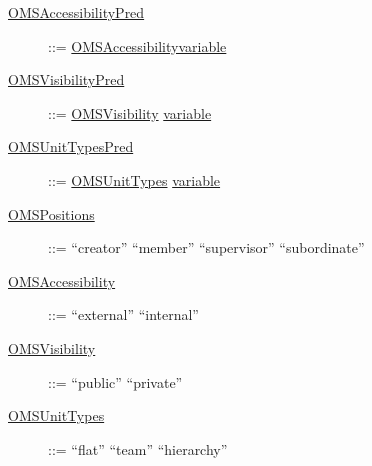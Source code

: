 \begin{description}
\item[\underline{OMSAccessibilityPred}] ::= \underline{OMSAccessibility}\textbar \underline{variable}

\item[\underline{OMSVisibilityPred}] ::= \underline{OMSVisibility} \textbar  \underline{variable}

\item[\underline{OMSUnitTypesPred}] ::= \underline{OMSUnitTypes} \textbar  \underline{variable}


\item[\underline{OMSPositions}] ::= ``creator'' \textbar ``member'' \textbar ``supervisor'' \textbar ``subordinate'' 

\item[\underline{OMSAccessibility}] ::= ``external'' \textbar ``internal''

\item[\underline{OMSVisibility}] ::= ``public'' \textbar ``private''

\item[\underline{OMSUnitTypes}] ::= ``flat'' \textbar ``team'' \textbar ``hierarchy''

\end{description}


